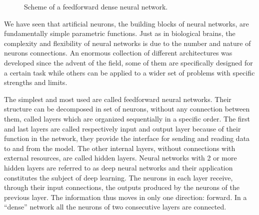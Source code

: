 \documentclass[a4paper,10pt]{report}
\begin{document}
\begin{figure}
\begin{center}
    \end{center}
    \caption{Scheme of a feedforward dense neural network.}
\end{figure}

We have seen that artificial neurons, the building blocks of neural networks,
are fundamentally simple parametric functions.
Just as in biological brains, the complexity and flexibility
of neural networks is due to the number and nature of neurons connections.
An enormous collection of different architectures was developed since the advent of the field,
some of them are specifically designed for a certain task while others can be applied
to a wider set of problems with specific strengths and limits.

The simplest and most used are called feedforward neural networks.
Their structure can be decomposed in set of neurons, without any connection between them, called layers which are
organized sequentially in a specific order.
The first and last layers are called respectively input and output layer because of
their function in the network, they provide the interface for sending and reading data to and from 
the model. The other internal layers, without connections with external resources, are called hidden layers.
Neural networks with 2 or more hidden layers are referred to as deep neural networks and their
application constitutes the subject of deep learning.
The neurons in each layer receive, through their input connections,
the outputs produced by the neurons of the previous layer.  The information thus moves in
only one direction: forward. In a ``dense'' network all the neurons of two consecutive layers
are connected.
\end{document}
